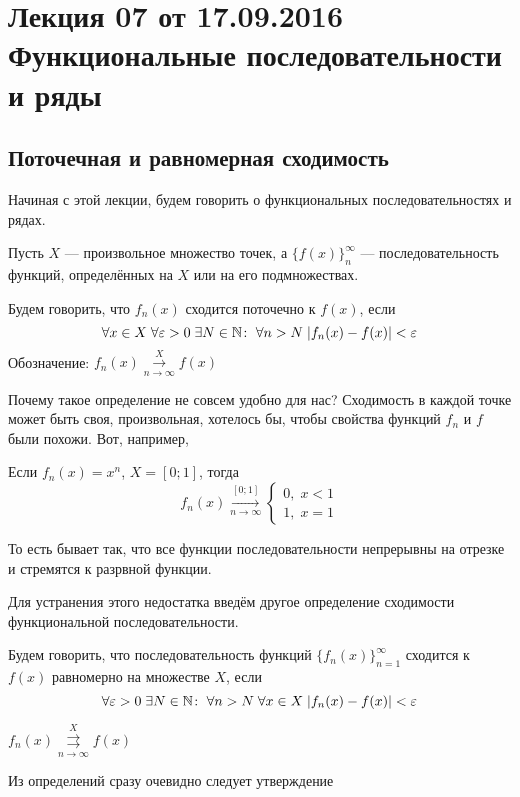 \documentclass[a4paper, 12pt]{article}
\begin{document}
\pagestyle{fancy}
\section{Лекция 07 от 17.09.2016 \\ Функциональные последовательности и ряды}
	\subsection{Поточечная и равномерная сходимость}
	Начиная с этой лекции, будем говорить о функциональных последовательностях и рядах.
	\par Пусть $X$ --- произвольное множество точек, а $\{f(x)\}_n^\infty$ --- последовательность функций, определённых на $X$ или на его подмножествах.
	\begin{Def}
		Будем говорить, что $f_n(x)$ сходится поточечно к $f(x)$, если
		$$
		\forall x \in X\; \forall \varepsilon>0\; \exists N\in \mathbb{N}\colon \; \forall n>N\; |f_n(x) - f(x)| < \varepsilon
		$$
		Обозначение: $f_n(x) \overset{X}{\underset{n\to\infty}{\longrightarrow}} f(x)$
	\end{Def}
	Почему такое определение не совсем удобно для нас? Сходимость в каждой точке может быть своя, произвольная, хотелось бы, чтобы свойства функций $f_n$ и $f$ были похожи. Вот, например,
	\begin{Examples}
		Если $f_n(x) = x^n$, $X = [0;1]$, тогда
		$$
		f_n(x) \overset{[0;1]}{\underset{n\to\infty}{\longrightarrow}}		
		\begin{cases*}
			0,\;x<1\\
			1,\;x = 1
		\end{cases*}
		$$
	\end{Examples}
	То есть бывает так, что все функции последовательности непрерывны на отрезке и стремятся к разрвной функции.
	\par Для устранения этого недостатка введём другое определение сходимости функциональной последовательности.
	\begin{Def}
		Будем говорить, что последовательность функций $\{f_n(x)\}_{n=1}^\infty$ сходится к $f(x)$ равномерно на множестве $X$, если 
		$$
		\forall \varepsilon > 0\; \exists N\in \mathbb{N}\colon \; \forall n>N\; \forall x \in X\; |f_n(x) - f(x)| < \varepsilon
		$$
	\end{Def}
	\begin{Designation}
		$f_n(x) \overset{X}{\underset{n\to\infty}{\rightrightarrows}} f(x)$
	\end{Designation}
	Из определений сразу очевидно следует утверждение
\end{document}
